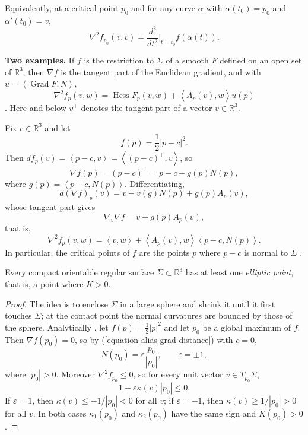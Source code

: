 Equivalently, at a critical point $p_0$
and for any curve $\alpha$ with
$\alpha(t_0)=p_0$ and $\alpha'(t_0)=v$,
$$
\nabla^2f_{p_0}(v,v)
=\frac{d^2}{dt^2}\Big|_{t=t_0}
f(\alpha(t)).
$$

\medskip\noindent
{\bf Two examples.}
If $f$ is the restriction to $\Sigma$ of a
smooth $F$ defined on an open set of
$\mathbb{R}^3$, then $\nabla f$ is the
tangent part of the Euclidean gradient,
and with $u=\left\langle{}
\operatorname{Grad}F,N\right\rangle{}$,
\begin{equation}
\label{equation-alias-restriction-hessian}
\nabla^2f_p(v,w)
=\operatorname{Hess}F_p(v,w)
+\left\langle{} A_p(v),w
\right\rangle{}u(p)
\end{equation}
\cite[Example 1.5,
p.~10]{alias2006analisis}. Here and below
$v^{\top}$ denotes the tangent part of a
vector $v\in\mathbb{R}^3$.

\begin{example}
\label{example-alias-squared-distance}
Fix $c\in\mathbb{R}^3$ and let
$$
f(p)=\frac{1}{2}|p-c|^2.
$$
Then $df_p(v)=\left\langle{} p-c,v
\right\rangle{}=\left\langle{}
(p-c)^{\top},v\right\rangle{}$, so
\begin{equation}
\label{equation-alias-grad-distance}
\nabla f(p)=(p-c)^{\top}
=p-c-g(p)N(p),
\end{equation}
where
$g(p)=\left\langle{} p-c,N(p)
\right\rangle{}$. Differentiating,
$$
d(\nabla f)_p(v)=v-v(g)N(p)
+g(p)A_p(v),
$$
whose tangent part gives
\begin{equation}
\label{equation-alias-hess-distance}
\nabla_v\nabla f=v+g(p)A_p(v),
\end{equation}
that is,
$$
\nabla^2f_p(v,w)=\left\langle{} v,w
\right\rangle{}+\left\langle{} A_p(v),w
\right\rangle{}\left\langle{} p-c,N(p)
\right\rangle{}.
$$
In particular, the critical points of
$f$ are the points $p$ where $p-c$ is
normal to $\Sigma$
\cite[Example 1.6,
p.~11]{alias2006analisis}.
\end{example}

\begin{theorem}
\label{theorem-alias-elliptic-point}
Every compact orientable regular surface
$\Sigma\subset\mathbb{R}^3$ has at least
one \emph{elliptic point}, that is, a
point where $K>0$.
\end{theorem}

\begin{proof}
The idea is to enclose $\Sigma$ in a large
sphere and shrink it until it first
touches $\Sigma$; at the contact point the
normal curvatures are bounded by those of
the sphere. Analytically
\cite[Theorem 2.1, p.~15]{alias2006analisis},
let $f(p)=\frac{1}{2}|p|^2$ and let $p_0$
be a global maximum of $f$. Then
$\nabla f(p_0)=0$, so by
(\ref{equation-alias-grad-distance}) with
$c=0$,
$$
N(p_0)=\varepsilon\frac{p_0}{|p_0|},
\qquad \varepsilon=\pm 1,
$$
where $|p_0|>0$. Moreover
$\nabla^2f_{p_0}\leq 0$, so for every
unit vector $v\in T_{p_0}\Sigma$,
$$
1+\varepsilon\kappa(v)|p_0|\leq 0.
$$
If $\varepsilon=1$, then
$\kappa(v)\leq -1/|p_0|<0$ for all $v$; if
$\varepsilon=-1$, then
$\kappa(v)\geq 1/|p_0|>0$ for all $v$.
In both cases $\kappa_1(p_0)$ and
$\kappa_2(p_0)$ have the same sign and
$K(p_0)>0$.
\end{proof}

